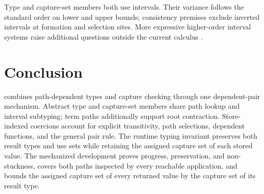 \documentclass[acmsmall,screen,nonacm]{acmart}
\begin{document}
Type and capture-set members both use intervals. Their variance follows the
standard order on lower and upper bounds; consistency premises exclude
inverted intervals at formation and selection sites.  More expressive
higher-order interval systems raise additional questions outside the current
calculus \citep{stucki2021intervals}.

\section{Conclusion}

\lambdapcc{} combines path-dependent types and capture checking through one
dependent-pair mechanism. Abstract type and capture-set members share path
lookup and interval subtyping; term paths additionally support root
contraction.  Store-indexed coercions account for explicit transitivity,
path selections, dependent functions, and the general pair rule. The runtime
typing invariant preserves both result types and use sets while retaining the
assigned capture set of each stored value. The mechanized development proves
progress, preservation, and non-stuckness, covers both paths inspected by
every reachable application, and bounds the assigned capture set of every
returned value by the capture set of its result type.



\end{document}
